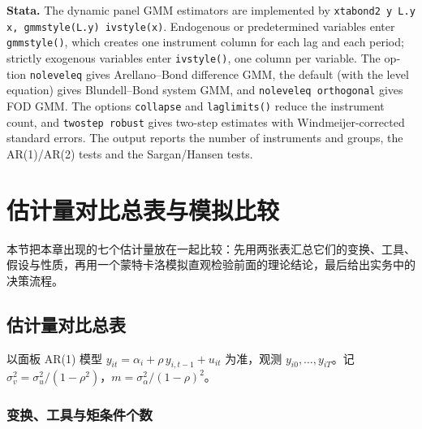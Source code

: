 \begin{english}
\textbf{Stata.} The dynamic panel GMM estimators are implemented by \texttt{xtabond2 y L.y x, gmmstyle(L.y) ivstyle(x)}. Endogenous or predetermined variables enter \texttt{gmmstyle()}, which creates one instrument column for each lag and each period; strictly exogenous variables enter \texttt{ivstyle()}, one column per variable. The option \texttt{noleveleq} gives Arellano--Bond difference GMM, the default (with the level equation) gives Blundell--Bond system GMM, and \texttt{noleveleq orthogonal} gives FOD GMM. The options \texttt{collapse} and \texttt{laglimits()} reduce the instrument count, and \texttt{twostep robust} gives two-step estimates with Windmeijer-corrected standard errors. The output reports the number of instruments and groups, the AR(1)/AR(2) tests and the Sargan/Hansen tests.
\end{english}

\section{估计量对比总表与模拟比较}\label{sec:U12c-compare}

本节把本章出现的七个估计量放在一起比较：先用两张表汇总它们的变换、工具、假设与性质，再用一个蒙特卡洛模拟直观检验前面的理论结论，最后给出实务中的决策流程。

\subsection{估计量对比总表}

以面板 AR(1) 模型 $y_{it}=\alpha_i+\rho\,y_{i,t-1}+u_{it}$ 为准，观测 $y_{i0},\dots,y_{iT}$。记 $\sigma_v^2=\sigma_u^2/(1-\rho^2)$，$m=\sigma_\alpha^2/(1-\rho)^2$。

\subsubsection{变换、工具与矩条件个数}

